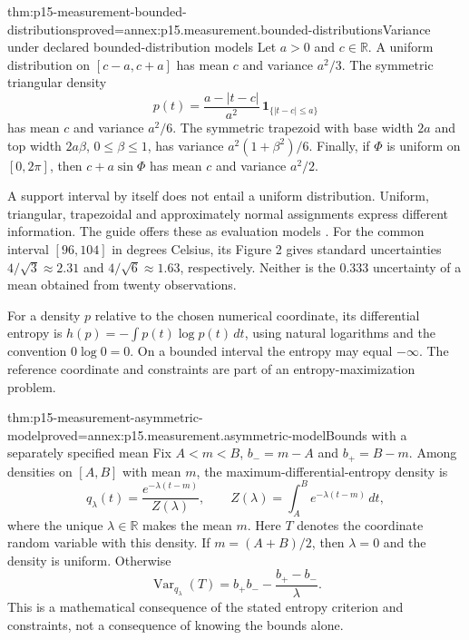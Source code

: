\begin{hbtheorem}{thm:p15-measurement-bounded-distributions}{proved=annex:p15.measurement.bounded-distributions}{Variance under declared bounded-distribution models}
Let \(a>0\) and \(c\in\mathbb R\).
A uniform distribution on \([c-a,c+a]\) has mean \(c\) and variance \(a^2/3\).
The symmetric triangular density
\[
 p(t)=\frac{a-|t-c|}{a^2}\,\mathbf1_{\{|t-c|\leq a\}}
\]
has mean \(c\) and variance \(a^2/6\).
The symmetric trapezoid with base width \(2a\) and top width \(2a\beta\),
\(0\leq\beta\leq1\), has variance \(a^2(1+\beta^2)/6\).
Finally, if \(\Phi\) is uniform on \([0,2\pi]\), then
\(c+a\sin\Phi\) has mean \(c\) and variance \(a^2/2\).
\end{hbtheorem}

A support interval by itself does not entail a uniform distribution. Uniform,
triangular, trapezoidal and approximately normal assignments express different
information. The guide offers these as evaluation models
\cite[4.3.7--4.3.9]{JCGM1002008EMeasurement}. For the common interval
\([96,104]\) in degrees Celsius, its Figure 2 gives standard uncertainties
\(4/\sqrt3\approx2.31\) and \(4/\sqrt6\approx1.63\), respectively.
Neither is the \(0.333\) uncertainty of a mean obtained from twenty
observations.

For a density \(p\) relative to the chosen numerical coordinate, its
differential entropy is \(h(p)=-\int p(t)\log p(t)\,dt\), using natural
logarithms and the convention \(0\log0=0\). On a bounded interval the
entropy may equal \(-\infty\). The reference coordinate and constraints
are part of an entropy-maximization problem.

\begin{hbtheorem}{thm:p15-measurement-asymmetric-model}{proved=annex:p15.measurement.asymmetric-model}{Bounds with a separately specified mean}
Fix \(A<m<B\), \(b_-=m-A\) and \(b_+=B-m\).
Among densities on \([A,B]\) with mean \(m\), the maximum-differential-entropy
density is
\[
 q_\lambda(t)=\frac{e^{-\lambda(t-m)}}{Z(\lambda)},\qquad
 Z(\lambda)=\int_A^B e^{-\lambda(t-m)}\,dt,
\]
where the unique \(\lambda\in\mathbb R\) makes the mean \(m\).
Here \(T\) denotes the coordinate random variable with this density.
If \(m=(A+B)/2\), then \(\lambda=0\) and the density is uniform.
Otherwise
\[
 \operatorname{Var}_{q_\lambda}(T)
 =b_+b_- -\frac{b_+-b_-}{\lambda}.
\]
This is a mathematical consequence of the stated entropy criterion and
constraints, not a consequence of knowing the bounds alone.
\end{hbtheorem}

